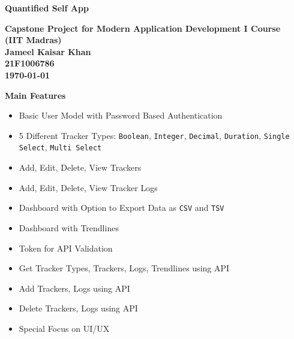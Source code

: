 \documentclass{article}
\begin{document}
\begin{titlepage}
    \centering
    {\huge\bfseries Quantified Self App\par}
    \vspace{1cm}
    {\LARGE \textbf{Capstone Project for Modern Application Development I Course\\(IIT Madras)}\\}
    \vspace{2cm}
    {\LARGE \textbf{Jameel Kaisar Khan}\\}
    {\LARGE \textbf{21F1006786}\\}
    {\LARGE \textbf{\today}\\}
    \vfill
\end{titlepage}

\newpage

\vspace{1cm}
{\huge \textbf{Main Features}}\\
\begin{itemize}
    \item Basic User Model with Password Based Authentication
    \item 5 Different Tracker Types: \verb|Boolean|, \verb|Integer|, \verb|Decimal|, \verb|Duration|, \verb|Single Select|, \verb|Multi Select|
    \item Add, Edit, Delete, View Trackers
    \item Add, Edit, Delete, View Tracker Logs
    \item Dashboard with Option to Export Data as \verb|CSV| and \verb|TSV|
    \item Dashboard with Trendlines
    \item Token for API Validation
    \item Get Tracker Types, Trackers, Logs, Trendlines using API
    \item Add Trackers, Logs using API
    \item Delete Trackers, Logs using API
    \item Special Focus on UI/UX
\end{itemize}
\end{document}
